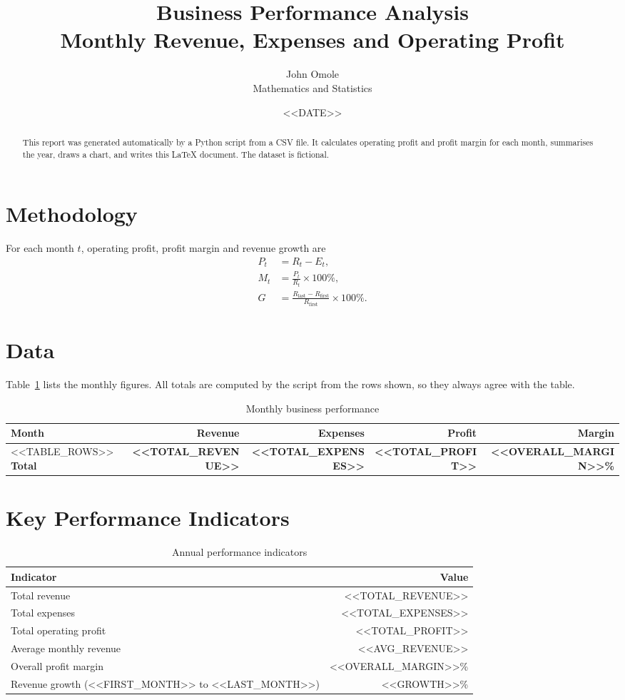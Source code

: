 \documentclass[11pt,a4paper]{article}
\title{Business Performance Analysis\\[2pt]\large Monthly Revenue, Expenses and Operating Profit}
\author{John Omole\\Mathematics and Statistics}
\date{<<DATE>>}
\begin{document}
\maketitle

\begin{abstract}
This report was generated automatically by a Python script from a CSV file.
It calculates operating profit and profit margin for each month, summarises
the year, draws a chart, and writes this \LaTeX{} document. The dataset is fictional.
\end{abstract}

\section{Methodology}
For each month $t$, operating profit, profit margin and revenue growth are
\begin{align}
P_t &= R_t - E_t, \\
M_t &= \frac{P_t}{R_t} \times 100\%, \\
G &= \frac{R_{\text{last}} - R_{\text{first}}}{R_{\text{first}}} \times 100\%.
\end{align}

\section{Data}
Table~\ref{tab:data} lists the monthly figures. All totals are computed by the
script from the rows shown, so they always agree with the table.

\begin{table}[h]
\centering
\caption{Monthly business performance}
\label{tab:data}
\begin{tabular}{lrrrr}
\toprule
Month & Revenue & Expenses & Profit & Margin \\
\midrule
<<TABLE_ROWS>>
\midrule
\textbf{Total} & \textbf{<<TOTAL_REVENUE>>} & \textbf{<<TOTAL_EXPENSES>>} & \textbf{<<TOTAL_PROFIT>>} & \textbf{<<OVERALL_MARGIN>>\%} \\
\bottomrule
\end{tabular}
\end{table}

\section{Key Performance Indicators}
\begin{table}[h]
\centering
\caption{Annual performance indicators}
\begin{tabular}{lr}
\toprule
Indicator & Value \\
\midrule
Total revenue & <<TOTAL_REVENUE>> \\
Total expenses & <<TOTAL_EXPENSES>> \\
Total operating profit & <<TOTAL_PROFIT>> \\
Average monthly revenue & <<AVG_REVENUE>> \\
Overall profit margin & <<OVERALL_MARGIN>>\% \\
Revenue growth (<<FIRST_MONTH>> to <<LAST_MONTH>>) & <<GROWTH>>\% \\
\bottomrule
\end{tabular}
\end{table}
\end{document}
